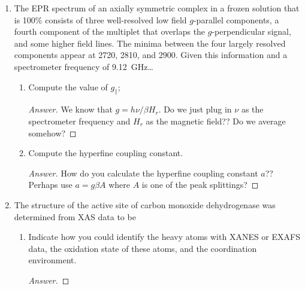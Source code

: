 \documentclass[../psets.tex]{subfiles}
\begin{document}
\begin{enumerate}
\begin{proof}[Answer]
        Since the $d^9$ (one electron unpaired) ion is in solution (not frozen), the $g$-values will be isotropic. Additionally, $I=3/2$ and the relevant selection rules ($\Delta M_S=\pm 1$ and $\Delta M_I=0$) means that the hyperfine splitting splits the peak into a quartet of peaks with the same height. Thus, the EPR spectrum should resemble the following.
        \begin{center}
            \texttt{[image: PSet2-EPR.jpg]}
        \end{center}
    \end{proof}
    \item The EPR spectrum of an axially symmetric  complex in a frozen solution that is 100\%  consists of three well-resolved low field $g$-parallel components, a fourth component of the multiplet that overlaps the $g$-perpendicular signal, and some higher field lines. The minima between the four largely resolved components appear at \SI{2720}{\gauss}, \SI{2810}{\gauss}, and \SI{2900}{\gauss}. Given this information and a spectrometer frequency of \SI{9.12}{\giga\hertz}\dots
    \begin{enumerate}
        \item Compute the value of $g_\parallel$;
        \begin{proof}[Answer]
            We know that $g=h\nu/\beta H_r$. Do we just plug in $\nu$ as the spectrometer frequency and $H_r$ as the magnetic field?? Do we average somehow?
        \end{proof}
        \item Compute the hyperfine coupling constant.
        \begin{proof}[Answer]
            How do you calculate the hyperfine coupling constant $a$?? Perhaps use $a=g\beta A$ where $A$ is one of the peak splittings?
        \end{proof}
    \end{enumerate}
    \item The structure of the active site of carbon monoxide dehydrogenase was determined from XAS data to be
    \begin{center}
        \footnotesize
    \end{center}
    \begin{enumerate}
        \item Indicate how you could identify the heavy atoms with XANES or EXAFS data, the oxidation state of these atoms, and the coordination environment.
        \begin{proof}[Answer]


\end{proof}
\end{enumerate}
\end{enumerate}
\end{document}
